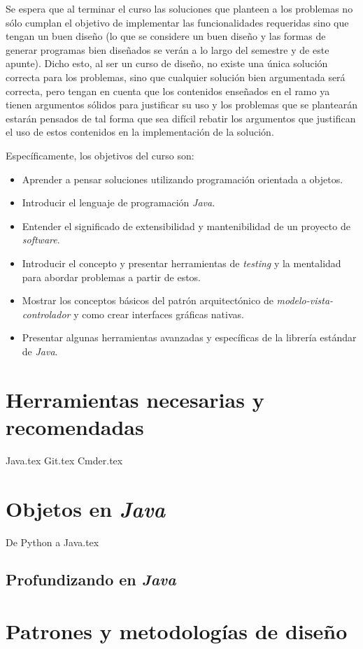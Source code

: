\documentclass[12pt]{book}
\theoremstyle{definition}
\begin{document}
      Se espera que al terminar el curso las soluciones que planteen a los problemas no
      sólo cumplan el objetivo de implementar las funcionalidades requeridas sino que 
      tengan un buen diseño (lo que se considere un buen diseño y las formas de generar 
      programas bien diseñados se verán a lo largo del semestre y de este apunte).
      Dicho esto, al ser un curso de diseño, no existe una única solución correcta para 
      los problemas, sino que cualquier solución bien argumentada será correcta, pero 
      tengan en cuenta que los contenidos enseñados en el ramo ya tienen argumentos 
      sólidos para justificar su uso y los problemas que se plantearán estarán pensados de
      tal forma que sea difícil rebatir los argumentos que justifican el uso de estos 
      contenidos en la implementación de la solución.

      Específicamente, los objetivos del curso son:

      \begin{itemize}
        \item Aprender a pensar soluciones utilizando programación orientada a objetos.
        \item Introducir el lenguaje de programación \textit{Java}.
        \item Entender el significado de extensibilidad y mantenibilidad de un proyecto de 
          \textit{software}.
        \item Introducir el concepto y presentar herramientas de \textit{testing} y la 
          mentalidad para abordar problemas a partir de estos.
        \item Mostrar los conceptos básicos del patrón arquitectónico de 
          \textit{modelo-vista-controlador} y como crear interfaces gráficas nativas.
        \item Presentar algunas herramientas avanzadas y específicas de la librería 
            estándar de \textit{Java}.
      \end{itemize}

  \mainmatter
  \part{Herramientas necesarias y recomendadas}
    {Java.tex}
    {Git.tex}
    {Cmder.tex}
  \part{Objetos en \textit{Java}}
    
    {De Python a Java.tex}
    \chapter{Profundizando en \textit{Java}}
      \label{ch:java}
  \part{Patrones y metodologías de diseño}
\end{document}
